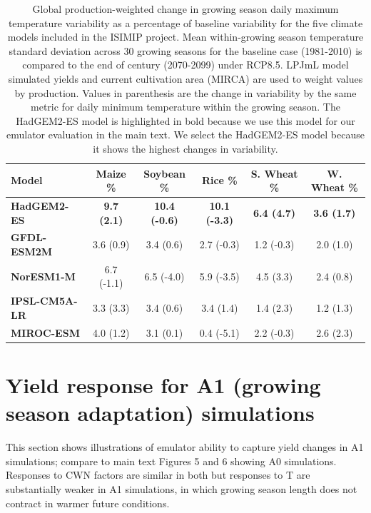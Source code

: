 \documentclass[12pt]{article}
\begin{document}
\begin{table}[h!]
{\small
    \caption{
    Global production-weighted change in growing season daily maximum temperature variability as a percentage of baseline variability for the five climate models included in the ISIMIP project. 
    Mean within-growing season temperature standard deviation across 30 growing seasons for the baseline case (1981-2010) is compared to the end of century (2070-2099) under RCP8.5.
    LPJmL model simulated yields and current cultivation area (MIRCA) are used to weight values by production.
    Values in parenthesis are the change in variability by the same metric for daily minimum temperature within the growing season.
    The HadGEM2-ES model is highlighted in bold because we use this model for our emulator evaluation in the main text. We select the HadGEM2-ES model because it shows the highest changes in variability.
    }
    \begin{tabular}{l | c | c | c | c | c} 
        \hline
        \textbf{Model} & \textbf{Maize \%} & \textbf{Soybean \%} & \textbf{Rice \%} & \textbf{S. Wheat \%} & \textbf{W. Wheat \%} \\ \hline
        \textbf{HadGEM2-ES}     & \textbf{9.7 (2.1)}  & \textbf{10.4 (-0.6)}  & \textbf{10.1 (-3.3)}  & \textbf{6.4 (4.7)}  & \textbf{3.6 (1.7)}  \\ \hline
        \textbf{GFDL-ESM2M}     & 3.6 (0.9)  & 3.4 (0.6)  & 2.7 (-0.3)  & 1.2 (-0.3) & 2.0 (1.0)  \\ \hline
        \textbf{NorESM1-M}      & 6.7 (-1.1)  & 6.5 (-4.0)  & 5.9 (-3.5)  & 4.5 (3.3)  & 2.4 (0.8)    \\ \hline
        \textbf{IPSL-CM5A-LR}   & 3.3 (3.3)  & 3.4 (0.6)  & 3.4 (1.4)  & 1.4 (2.3)  & 1.2 (1.3)  \\ \hline
        \textbf{MIROC-ESM} & 4.0 (1.2)  & 3.1 (0.1)  & 0.4 (-5.1)  & 2.2 (-0.3)  & 2.6 (2.3)  \\ \hline
    \end{tabular}
}
\end{table}

\clearpage
\section{Yield response for A1 (growing season adaptation) simulations}
\begin{flushleft}
	This section shows illustrations of emulator ability to capture yield changes in A1 simulations; compare to main text Figures 5 and 6 showing A0 simulations. Responses to CWN factors are similar in both but responses to T are substantially weaker in A1 simulations, in which growing season length does not contract in warmer future conditions.
\end{flushleft}
\end{document}
